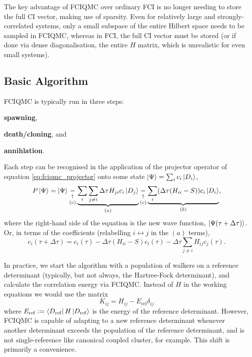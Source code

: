 The key advantage of \gls{FCIQMC} over ordinary \gls{FCI} is no longer needing to store the full \gls{CI} vector, making use of sparsity. Even for relatively large and strongly-correlated systems, only a small subspace of the entire Hilbert space needs to be sampled in FCIQMC, whereas in FCI, the full CI vector must be stored (or if done via dense diagonalisation, the entire $H$ matrix, which is unrealistic for even small systems).

\subsection{Basic Algorithm}

\gls{FCIQMC} is typically run in three steps:
\begin{enumerate*}[label=(\alph*), itemjoin={\hspace{1em}}]
    \item \textbf{spawning},
    \item \textbf{death/cloning}, and
    \item \textbf{annihlation}.
\end{enumerate*}
Each step can be recognised in the application of the projector operator of equation \ref{eq:fciqmc_projector} onto some state
$\ket\Psi = \sum_i c_i\ket{D_i}$,
\begin{equation}
    \label{eq:fciqmc_projector_application}
    P\ket\Psi = \ket\Psi \underset{(c)}{\underset{\uparrow}{-}} \underbrace{\sum_{i}\sum_{j\neq i}\Delta\tau H_{ji}c_i\ket{D_j}}_{(a)} \underset{(c)}{\underset{\uparrow}{-}} \underbrace{\sum_i (\Delta\tau(H_{ii}-S))c_i\ket{D_i}}_{(b)},
\end{equation}
where the right-hand side of the equation is the new wave function, $\ket{\Psi(\tau+\Delta\tau)}$. Or, in terms of the coefficients (relabelling $i\leftrightarrow j$ in the $(a)$ terms),
\begin{equation}
    c_i(\tau+\Delta\tau) = c_i(\tau) - \Delta\tau(H_{ii}-S)c_i(\tau) - \Delta\tau\sum_{j\neq i}H_{ij}c_j(\tau).
\end{equation}

In practice, we start the algorithm with a population of walkers on a reference determinant (typically, but not always, the Hartree-Fock determinant), and calculate the correlation energy via FCIQMC. Instead of $H$ in the working equations we would use the matrix
\begin{equation}
    K_{ij} = H_{ij} - E_\mathrm{ref}\delta_{ij}
\end{equation}
where $E_\mathrm{ref}\mathrel{\mathop:}=\bra{D_\mathrm{ref}}H\ket{D_\mathrm{ref}}$ is the energy of the reference determinant. However, FCIQMC is capable of adapting to a new reference determinant whenever another determinant exceeds the population of the reference determinant, and is not single-reference like canonical coupled cluster, for example. This shift is primarily a convenience.

